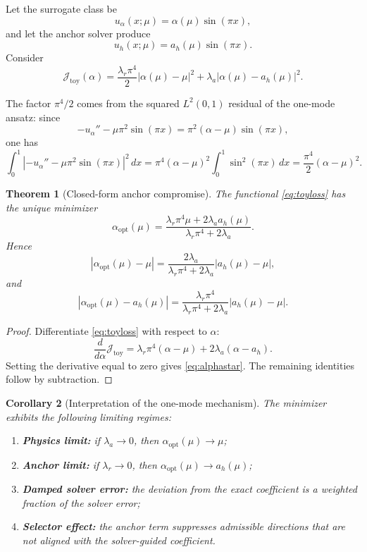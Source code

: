 \documentclass[preprint,12pt]{elsarticle}
\newtheorem{theorem}{Theorem}[section]
\newtheorem{corollary}[theorem]{Corollary}
\theoremstyle{definition}
\numberwithin{equation}{section}
\newcommand{\abs}[1]{\left\lvert #1 \right\rvert}
\begin{document}
Let the surrogate class be
\[
u_\alpha(x;\mu)=\alpha(\mu)\sin(\pi x),
\]
and let the anchor solver produce
\[
u_h(x;\mu)=a_h(\mu)\sin(\pi x).
\]
Consider
\begin{equation}
\mathcal{J}_{\mathrm{toy}}(\alpha)=
\frac{\lambda_r\pi^4}{2}\abs{\alpha(\mu)-\mu}^2
+
\lambda_a\abs{\alpha(\mu)-a_h(\mu)}^2.
\label{eq:toyloss}
\end{equation}

The factor $\pi^4/2$ comes from the squared $L^2(0,1)$ residual of the one-mode ansatz: since
\[
-u_\alpha''-\mu\pi^2\sin(\pi x)=\pi^2(\alpha-\mu)\sin(\pi x),
\]
one has
\[
\int_0^1 \abs{-u_\alpha''-\mu\pi^2\sin(\pi x)}^2\,dx
=
\pi^4(\alpha-\mu)^2 \int_0^1 \sin^2(\pi x)\,dx
=
\frac{\pi^4}{2}(\alpha-\mu)^2.
\]

\begin{theorem}[Closed-form anchor compromise]
\label{thm:toy}
The functional \eqref{eq:toyloss} has the unique minimizer
\begin{equation}
\alpha_{\mathrm{opt}}(\mu)=
\frac{\lambda_r\pi^4\mu+2\lambda_a a_h(\mu)}
{\lambda_r\pi^4+2\lambda_a}.
\label{eq:alphastar}
\end{equation}
Hence
\begin{equation}
\abs{\alpha_{\mathrm{opt}}(\mu)-\mu}
=
\frac{2\lambda_a}{\lambda_r\pi^4+2\lambda_a}\abs{a_h(\mu)-\mu},
\label{eq:alphaerror}
\end{equation}
and
\begin{equation}
\abs{\alpha_{\mathrm{opt}}(\mu)-a_h(\mu)}
=
\frac{\lambda_r\pi^4}{\lambda_r\pi^4+2\lambda_a}\abs{a_h(\mu)-\mu}.
\label{eq:alphaanchor}
\end{equation}
\end{theorem}

\begin{proof}
Differentiate \eqref{eq:toyloss} with respect to $\alpha$:
\[
\frac{d}{d\alpha}\mathcal{J}_{\mathrm{toy}}
=
\lambda_r\pi^4(\alpha-\mu)+2\lambda_a(\alpha-a_h).
\]
Setting the derivative equal to zero gives \eqref{eq:alphastar}. The remaining identities follow by subtraction.
\end{proof}

\begin{corollary}[Interpretation of the one-mode mechanism]
\label{cor:toy}
The minimizer exhibits the following limiting regimes:
\begin{enumerate}[label=\roman*)]
    \item \textbf{Physics limit:} if $\lambda_a\to0$, then $\alpha_{\mathrm{opt}}(\mu)\to\mu$;
    \item \textbf{Anchor limit:} if $\lambda_r\to0$, then $\alpha_{\mathrm{opt}}(\mu)\to a_h(\mu)$;
    \item \textbf{Damped solver error:} the deviation from the exact coefficient is a weighted fraction of the solver error;
    \item \textbf{Selector effect:} the anchor term suppresses admissible directions that are not aligned with the solver-guided coefficient.
\end{enumerate}
\end{corollary}
\end{document}
